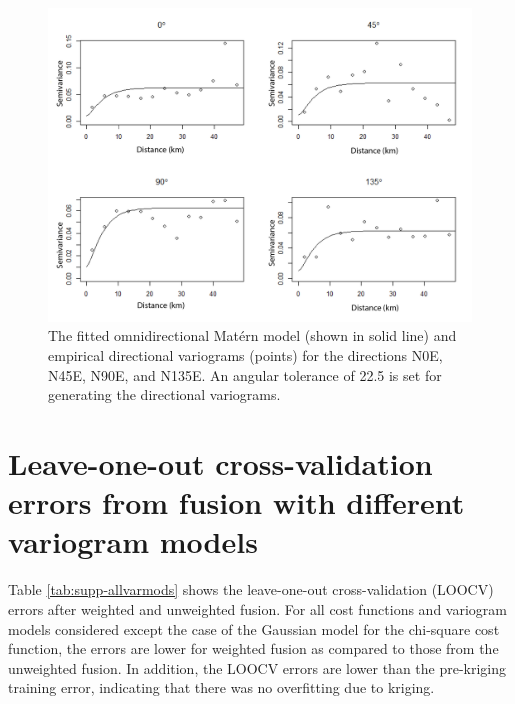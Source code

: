     \begin{figure}[htbp!]
    \centering
    \includegraphics[width=\linewidth]{Figures/fig12_variograms-directions.png}
    \caption{The fitted omnidirectional Mat\'ern model (shown in solid line) and empirical directional variograms (points) for the directions N0E, N45E, N90E, and N135E. An angular tolerance of 22.5 is set for generating the directional variograms.}
    \label{fig:vars_direct}
    \end{figure}
  

\section{Leave-one-out cross-validation errors from fusion with different variogram models}\label{supp-e}

Table \ref{tab:supp-allvarmods} shows the leave-one-out cross-validation (LOOCV) errors after weighted and unweighted fusion. For all cost functions and variogram models considered except the case of the Gaussian model for the chi-square cost function, the errors are lower for weighted fusion as compared to those from the unweighted fusion. In addition, the LOOCV errors are lower than the pre-kriging training error, indicating that there was no overfitting due to kriging. 


